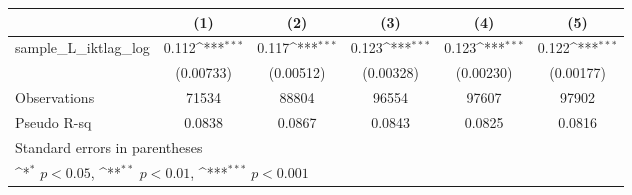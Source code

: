 {
\def\sym#1{\ifmmode^{#1}\else\(^{#1}\)\fi}
\begin{tabular}{l*{5}{c}}
\hline\hline
                &\multicolumn{1}{c}{(1)}         &\multicolumn{1}{c}{(2)}         &\multicolumn{1}{c}{(3)}         &\multicolumn{1}{c}{(4)}         &\multicolumn{1}{c}{(5)}         \\
\hline
sample\_L\_iktlag\_log&    0.112\sym{***}&    0.117\sym{***}&    0.123\sym{***}&    0.123\sym{***}&    0.122\sym{***}\\
                &(0.00733)         &(0.00512)         &(0.00328)         &(0.00230)         &(0.00177)         \\
\hline
Observations    &    71534         &    88804         &    96554         &    97607         &    97902         \\
Pseudo R-sq     &   0.0838         &   0.0867         &   0.0843         &   0.0825         &   0.0816         \\
\hline\hline
\multicolumn{6}{l}{\footnotesize Standard errors in parentheses}\\
\multicolumn{6}{l}{\footnotesize \sym{*} \(p<0.05\), \sym{**} \(p<0.01\), \sym{***} \(p<0.001\)}\\
\end{tabular}
}
